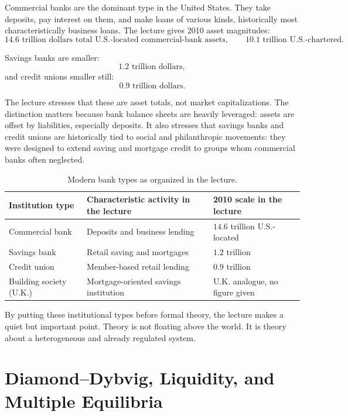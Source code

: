 Commercial banks are the dominant type in the United States. They take deposits, pay interest on them, and make loans of various kinds, historically most characteristically business loans. The lecture gives 2010 asset magnitudes:
\begin{equation}
14.6\text{ trillion dollars total U.S.-located commercial-bank assets},\qquad
10.1\text{ trillion U.S.-chartered}.
\end{equation}

Savings banks are smaller:
\begin{equation}
1.2\text{ trillion dollars},
\end{equation}
and credit unions smaller still:
\begin{equation}
0.9\text{ trillion dollars}.
\end{equation}

The lecture stresses that these are asset totals, not market capitalizations. The distinction matters because bank balance sheets are heavily leveraged: assets are offset by liabilities, especially deposits. It also stresses that savings banks and credit unions are historically tied to social and philanthropic movements: they were designed to extend saving and mortgage credit to groups whom commercial banks often neglected.

\begin{table}[h]
\centering
\begin{tabular}{|l|l|l|}
\hline
Institution type & Characteristic activity in the lecture & 2010 scale in the lecture \\
\hline
Commercial bank & Deposits and business lending & \(14.6\) trillion U.S.-located \\
\hline
Savings bank & Retail saving and mortgages & \(1.2\) trillion \\
\hline
Credit union & Member-based retail lending & \(0.9\) trillion \\
\hline
Building society (U.K.) & Mortgage-oriented savings institution & U.K. analogue, no figure given \\
\hline
\end{tabular}
\caption{Modern bank types as organized in the lecture.}
\end{table}

By putting these institutional types before formal theory, the lecture makes a quiet but important point. Theory is not floating above the world. It is theory about a heterogeneous and already regulated system.

\section{Diamond--Dybvig, Liquidity, and Multiple Equilibria}

